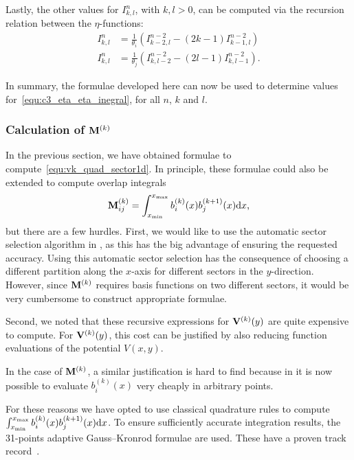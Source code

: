 Lastly, the other values for $I_{k,l}^n$, with $k, l > 0$, can be computed via the recursion relation between the $\eta$-functions:
\begin{align*}
  I_{k, l}^n & = \frac{1}{\theta_i} \left(I_{k-2,l}^{n-2} - (2k - 1) I_{k-1,l}^{n-2}\right) \\
  I_{k, l}^n & = \frac{1}{\theta_j} \left(I_{k,l-2}^{n-2} - (2l - 1) I_{k,l-1}^{n-2}\right)\text{.}
\end{align*}

In summary, the formulae developed here can now be used to determine values for~\eqref{equ:c3_eta_eta_inegral}, for all $n$, $k$ and $l$.

\subsubsection{Calculation of \texorpdfstring{$\vb{M}^{(k)}$}{M(k)}}

In the previous section, we have obtained formulae to compute~\eqref{equ:vk_quad_sector1d}. In principle, these formulae could also be extended to compute overlap integrals
$$
  \vb{M}_{ij}^{(k)} = \int_{{x_{\text{min}}}}^{{x_{\text{max}}}}b_i^{(k)}(x)b_j^{(k+1)}(x)\dd x\text{,}
$$
but there are a few hurdles. First, we would like to use the automatic sector selection algorithm in \matslise{}, as this has the big advantage of ensuring the requested accuracy. Using this automatic sector selection has the consequence of choosing a different partition along the $x$-axis for different sectors in the $y$-direction. However, since $\vb{M}^{(k)}$ requires basis functions on two different sectors, it would be very cumbersome to construct appropriate formulae.

Second, we noted that these recursive expressions for $\vb{V}^{(k)}(y)$ are quite expensive to compute. For $\vb{V}^{(k)}(y)$, this cost can be justified by also reducing function evaluations of the potential $V(x, y)$.

In the case of $\vb{M}^{(k)}$, a similar justification is hard to find because in  it is now possible to evaluate $b^{(k)}_i(x)$ very cheaply in arbitrary points.

For these reasons we have opted to use classical quadrature rules to compute $\int_{{x_{\text{min}}}}^{{x_{\text{max}}}}b_i^{(k)}(x)b_j^{(k+1)}(x)\dd x$. To ensure sufficiently accurate integration results, the 31-points adaptive Gauss--Kronrod formulae are used. These have a proven track record~\cite{piessens_quadpack_1983}.



